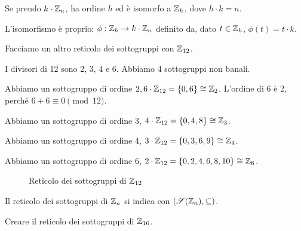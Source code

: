 \begin{exmp}
\begin{oss}
Se prendo $k \cdot \mathbb{Z}_n$, ha ordine $h$ ed \`e isomorfo a $\mathbb{Z}_h$, dove $h \cdot k = n$.

L'isomorfismo \`e proprio: $\phi : \mathbb{Z}_h \to k \cdot \mathbb{Z}_n$ definito da, dato $t \in \mathbb{Z}_h$, $\phi(t) = t \cdot k$.
\end{oss}

Facciamo un altro reticolo dei sottogruppi con $\mathbb{Z}_{12}$.

I divisori di 12 sono 2, 3, 4 e 6. Abbiamo 4 sottogruppi non banali.

Abbiamo un sottogruppo di ordine $2, 6 \cdot \mathbb{Z}_{12} = \{ 0, 6 \} \cong \mathbb{Z}_2$. L'ordine di 6 \`e 2, perch\'e $6 + 6 \equiv 0 \pmod{12}$.

Abbiamo un sottogruppo di ordine 3, $4 \cdot \mathbb{Z}_{12} = \{ 0, 4, 8 \} \cong \mathbb{Z}_3$.

Abbiamo un sottogruppo di ordine 4, $3 \cdot \mathbb{Z}_{12} = \{ 0, 3, 6, 9 \} \cong \mathbb{Z}_4$.

Abbiamo un sottogruppo di ordine 6, $2 \cdot \mathbb{Z}_{12} = \{ 0, 2, 4, 6, 8, 10 \} \cong \mathbb{Z}_6$.

\begin{figure}
\centering
{}
\caption{Reticolo dei sottogruppi di $\mathbb{Z}_{12}$}
\end{figure}

Il reticolo dei sottogruppi di $\mathbb{Z}_n$ si indica con $(\mathscr{S}(\mathbb{Z}_n), \subseteq)$.
\end{exmp}

\begin{esercizio}
Creare il reticolo dei sottogruppi di $\mathbb{Z}_{16}$.
\end{esercizio}

